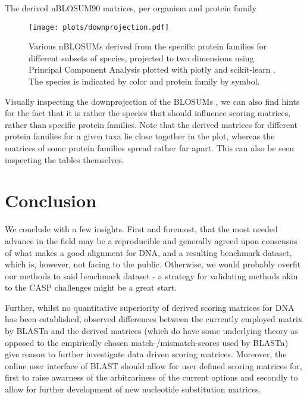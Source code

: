 \documentclass{article}
\begin{document}
	\begin{table}
	
	\caption{The derived nBLOSUM90 matrices, per organism and protein family}
	\end{table}
\onecolumn
\pagebreak

\begin{figure}[!htp]
		\centering
		\texttt{[image: plots/downprojection.pdf]}
		\caption{Various nBLOSUMs derived from the specific protein
		families for different subsets of species, projected to two
		dimensions using Principal Component Analysis
	\cite{leverPrincipalComponentAnalysis2017} plotted with plotly
\cite{plotly} and scikit-learn \cite{scikit-learn}. The species is indicated
by color and protein family by symbol.}
	\end{figure}

Visually inspecting the downprojection of the BLOSUMs , we can also find
hints for the fact that it is rather the species that should influence scoring
matrices, rather than specific protein families. Note that the derived matrices
for different protein families for a given taxa lie close together in the plot,
whereas the matrices of some protein families spread rather far apart. This can also be
seen inspecting the tables themselves.

\section*{Conclusion}
We conclude with a few insights. First and foremost, that the most 
needed advance in the field may be a reproducible and generally agreed upon
consensus of what makes a good alignment for DNA, and a resulting benchmark
dataset, which is, however, not facing to the public. Otherwise, we would
probably overfit our methods to said benchmark dataset - a strategy for
validating methods akin to the CASP challenges might be a great start.

Further, whilst no quantitative superiority of derived scoring matrices for DNA
has been established, observed differences between the currently employed matrix by BLASTn and the derived matrices (which do have some underlying theory as
opposed to the empirically chosen match-/mismatch-scores used by BLASTn) give
reason to further investigate data driven scoring matrices. Moreover, the
online user interface of BLAST should allow for user defined scoring matrices
for, first to raise awarness of the arbitrariness of the current options and
secondly to allow for further development of new nucleotide substitution
matrices.

\pagebreak
\nocite{reback2020pandas}
\printbibliography
\end{document}
